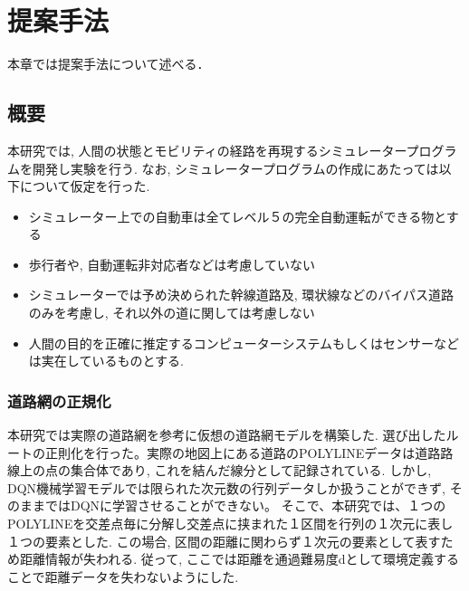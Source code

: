 \chapter{提案手法}
\label{proposed}

本章では提案手法について述べる．

\section{概要}

本研究では, 人間の状態とモビリティの経路を再現するシミュレータープログラムを開発し実験を行う.
なお, シミュレータープログラムの作成にあたっては以下について仮定を行った.

\begin{itemize}
    \item シミュレーター上での自動車は全てレベル５の完全自動運転ができる物とする
    \item 歩行者や, 自動運転非対応者などは考慮していない
    \item シミュレーターでは予め決められた幹線道路及, 環状線などのバイパス道路のみを考慮し, それ以外の道に関しては考慮しない
    \item 人間の目的を正確に推定するコンピューターシステムもしくはセンサーなどは実在しているものとする. 
\end{itemize}

\subsection{道路網の正規化}

本研究では実際の道路網を参考に仮想の道路網モデルを構築した.
選び出したルートの正則化を行った。実際の地図上にある道路のPOLYLINEデータは道路路線上の点の集合体であり, これを結んだ線分として記録されている. しかし, DQN機械学習モデルでは限られた次元数の行列データしか扱うことができず, そのままではDQNに学習させることができない。
そこで、本研究では、１つのPOLYLINEを交差点毎に分解し交差点に挟まれた１区間を行列の１次元に表し１つの要素とした.
この場合, 区間の距離に関わらず１次元の要素として表すため距離情報が失われる. 従って, ここでは距離を通過難易度dとして環境定義することで距離データを失わないようにした.


